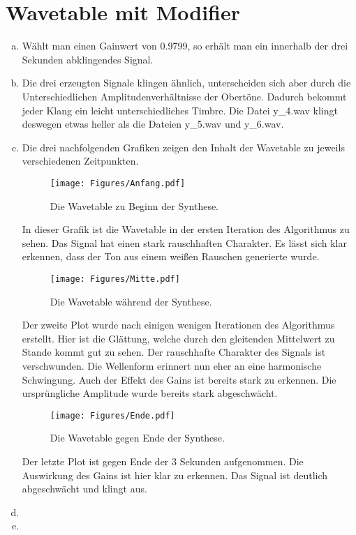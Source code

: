 \chapter{Wavetable mit Modifier}


\begin{enumerate}[a)]
\item
Wählt man einen Gainwert von 0.9799, so erhält man ein innerhalb der drei Sekunden abklingendes Signal.

\item
Die drei erzeugten Signale klingen ähnlich, unterscheiden sich aber durch die Unterschiedlichen Amplitudenverhältnisse der Obertöne. Dadurch bekommt jeder Klang ein leicht unterschiedliches Timbre. Die Datei y\_4.wav klingt deswegen etwas heller als die Dateien y\_5.wav und y\_6.wav.

\item
Die drei nachfolgenden Grafiken zeigen den Inhalt der Wavetable zu jeweils verschiedenen Zeitpunkten.

\begin{figure}[H]
    \center
    \texttt{[image: Figures/Anfang.pdf]}
    \caption{Die Wavetable zu Beginn der Synthese.}
    \label{fig:bs1}
\end{figure}

In dieser Grafik ist die Wavetable in der ersten Iteration des Algorithmus zu sehen.
Das Signal hat einen stark rauschhaften Charakter.
Es lässt sich klar erkennen, dass der Ton aus einem weißen Rauschen generierte wurde. 

\begin{figure}[H]
    \center
    \texttt{[image: Figures/Mitte.pdf]}
    \caption{Die Wavetable während der Synthese.}
    \label{fig:bs1}
\end{figure}

Der zweite Plot wurde nach einigen wenigen Iterationen des Algorithmus erstellt.
Hier ist die Glättung, welche durch den gleitenden Mittelwert zu Stande kommt gut zu sehen.
Der rauschhafte Charakter des Signals ist verschwunden.
Die Wellenform erinnert nun eher an eine harmonische Schwingung.
Auch der Effekt des Gains ist bereits stark zu erkennen.
Die ursprüngliche Amplitude wurde bereits stark abgeschwächt.

\begin{figure}[H]
    \center
    \texttt{[image: Figures/Ende.pdf]}
    \caption{Die Wavetable gegen Ende der Synthese.}
    \label{fig:bs1}
\end{figure}

Der letzte Plot ist gegen Ende der 3 Sekunden aufgenommen.
Die Auswirkung des Gains ist hier klar zu erkennen. 
Das Signal ist deutlich abgeschwächt und klingt aus.

\item

\item

\end{enumerate}
